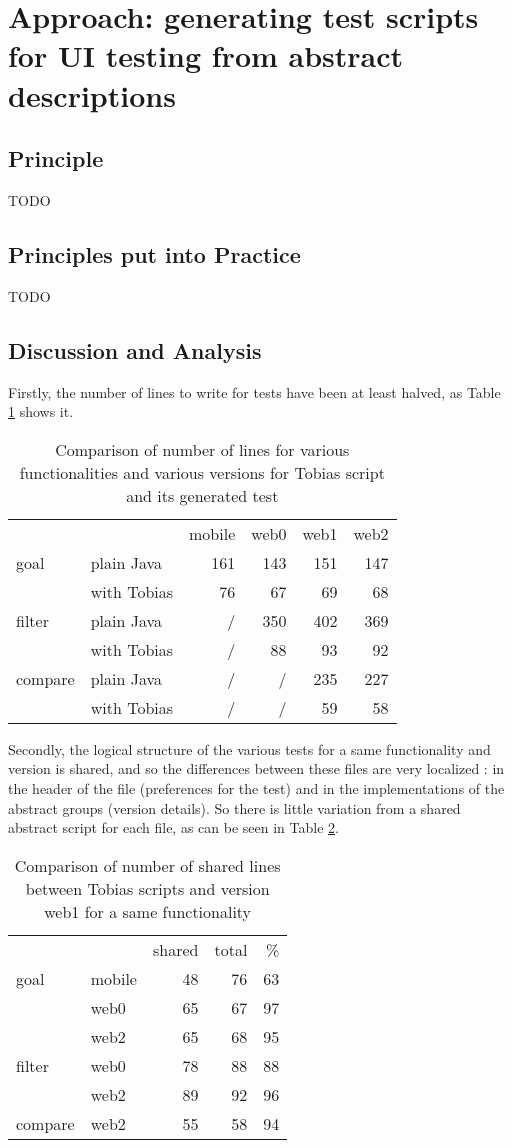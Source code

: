 \documentclass{chi-ext}
\begin{document}
\section{Approach: generating test scripts for UI testing from abstract descriptions}
\subsection{Principle}
TODO

\subsection{Principles put into Practice}
TODO

\subsection{Discussion and Analysis}
Firstly, the number of lines to write for tests have been at least halved, as Table \ref{table:scriptssize} shows it.
\begin{table}
\begin{tabular}{l l r r r r}
			&					&	mobile	&	web0	&	web1	&	web2	\\
goal		&	plain Java	&	161		&	143		&	151		&	147		\\
			&	with Tobias	&	76		&	67		&	69		&	68		\\
filter		&	plain Java	&	/		&	350		&	402		&	369		\\
			&	with Tobias	&	/		&	88		&	93		&	92		\\
compare	&	plain Java	&	/		&	/		&	235		&	227		\\
			&	with Tobias	&	/		&	/		&	59		&	58
\end{tabular}
\caption{Comparison of number of lines for various functionalities and various versions for Tobias script and its generated test}
\label{table:scriptssize}
\end{table}
Secondly, the logical structure of the various tests for a same functionality and version is shared, and so the differences between these files are very localized : in the header of the file (preferences for the test) and in the implementations of the abstract groups (version details). So there is little variation from a shared abstract script for each file, as can be seen in Table \ref{table:scripts-similarity}.
\begin{table}
\begin{tabular}{l l r r r}
			&			&	shared	&	total	&	\%	\\
goal		&	mobile	&	48		&	76		&	63	\\
			&	web0	&	65		&	67		&	97	\\
			&	web2	&	65		&	68		&	95	\\
filter		&	web0	&	78		&	88		&	88	\\
			&	web2	&	89		&	92		&	96	\\
compare	&	web2	&	55		&	58		&	94
\end{tabular}
\caption{Comparison of number of shared lines between Tobias scripts and version web1 for a same functionality}
\label{table:scripts-similarity}
\end{table}
\end{document}
